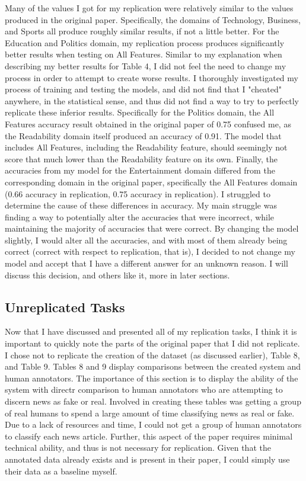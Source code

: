 \documentclass{article}
\begin{document}
Many of the values I got for my replication were relatively similar to the values produced in the original paper. Specifically, the domains of Technology, Business, and Sports all produce roughly similar results, if not a little better. For the Education and Politics domain, my replication process produces significantly better results when testing on All Features. Similar to my explanation when describing my better results for Table 4, I did not feel the need to change my process in order to attempt to create worse results. I thoroughly investigated my process of training and testing the models, and did not find that I "cheated" anywhere, in the statistical sense, and thus did not find a way to try to perfectly replicate these inferior results. Specifically for the Politics domain, the All Features accuracy result obtained in the original paper of 0.75 confused me, as the Readability domain itself produced an accuracy of 0.91. The model that includes All Features, including the Readability feature, should seemingly not score that much lower than the Readability feature on its own. Finally, the accuracies from my model for the Entertainment domain differed from the corresponding domain in the original paper, specifically the All Features domain (0.66 accuracy in replication, 0.75 accuracy in replication). I struggled to determine the cause of these differences in accuracy. My main struggle was finding a way to potentially alter the accuracies that were incorrect, while maintaining the majority of accuracies that were correct. By changing the model slightly, I would alter all the accuracies, and with most of them already being correct (correct with respect to replication, that is), I decided to not change my model and accept that I have a different answer for an unknown reason. I will discuss this decision, and others like it, more in later sections. 

\subsection{Unreplicated Tasks}

Now that I have discussed and presented all of my replication tasks, I think it is important to quickly note the parts of the original paper that I did not replicate. I chose not to replicate the creation of the dataset (as discussed earlier), Table 8, and Table 9. Tables 8 and 9 display comparisons between the created system and human annotators. The importance of this section is to display the ability of the system with directr comparison to human annotators who are attempting to discern news as fake or real. Involved in creating these tables was getting a group of real humans to spend a large amount of time classifying news as real or fake. Due to a lack of resources and time, I could not get a group of human annotators to classify each news article. Further, this aspect of the paper requires minimal technical ability, and thus is not necessary for replication. Given that the annotated data already exists and is present in their paper, I could simply use their data as a baseline myself.
\end{document}
